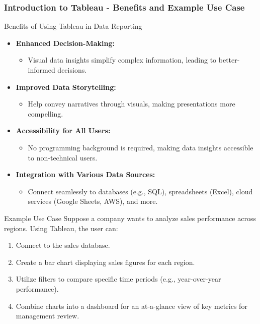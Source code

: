 \documentclass[aspectratio=169]{beamer}
\begin{document}
\begin{frame}[fragile]
    \frametitle{Introduction to Tableau - Benefits and Example Use Case}
    \begin{block}{Benefits of Using Tableau in Data Reporting}
        \begin{itemize}
            \item \textbf{Enhanced Decision-Making:}
                \begin{itemize}
                    \item Visual data insights simplify complex information, leading to better-informed decisions.
                \end{itemize}
            \item \textbf{Improved Data Storytelling:}
                \begin{itemize}
                    \item Help convey narratives through visuals, making presentations more compelling.
                \end{itemize}
            \item \textbf{Accessibility for All Users:}
                \begin{itemize}
                    \item No programming background is required, making data insights accessible to non-technical users.
                \end{itemize}
            \item \textbf{Integration with Various Data Sources:}
                \begin{itemize}
                    \item Connect seamlessly to databases (e.g., SQL), spreadsheets (Excel), cloud services (Google Sheets, AWS), and more.
                \end{itemize}
        \end{itemize}
    \end{block}
    
    \begin{block}{Example Use Case}
        Suppose a company wants to analyze sales performance across regions. Using Tableau, the user can:
        \begin{enumerate}
            \item Connect to the sales database.
            \item Create a bar chart displaying sales figures for each region.
            \item Utilize filters to compare specific time periods (e.g., year-over-year performance).
            \item Combine charts into a dashboard for an at-a-glance view of key metrics for management review.
        \end{enumerate}
    \end{block}
\end{frame}
\end{document}
